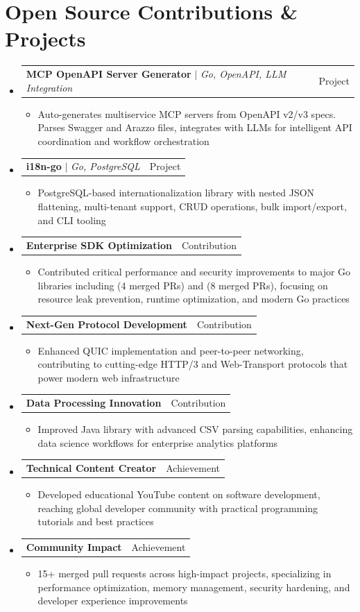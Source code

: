 \documentclass[letterpaper,11pt]{article}
\makeatletter
\newcommand{\resumeItem}[1]{
  \item\small{
    {#1 \vspace{-2pt}}
  }
}
\newcommand{\resumeProjectHeading}[2]{
    \item
    \begin{tabular*}{0.97\textwidth}{l@{\extracolsep{\fill}}r}
      \small#1 & #2 \\
    \end{tabular*}\vspace{-7pt}
}
\newcommand{\resumeSubHeadingListStart}{\begin{itemize}[leftmargin=0.15in, label={}]}
\newcommand{\resumeSubHeadingListEnd}{\end{itemize}}
\newcommand{\resumeItemListStart}{\begin{itemize}}
\newcommand{\resumeItemListEnd}{\end{itemize}\vspace{-5pt}}
\makeatother
\begin{document}
\section{Open Source Contributions \& Projects}
  \resumeSubHeadingListStart
    \resumeProjectHeading
          {\textbf{MCP OpenAPI Server Generator} $|$ \emph{Go, OpenAPI, LLM Integration}}{Project}
          \resumeItemListStart
            \resumeItem{Auto-generates multiservice MCP servers from OpenAPI v2/v3 specs. Parses Swagger and Arazzo files, integrates with LLMs for intelligent API coordination and workflow orchestration}
          \resumeItemListEnd
    \resumeProjectHeading
          {\textbf{i18n-go} $|$ \emph{Go, PostgreSQL}}{Project}
          \resumeItemListStart
            \resumeItem{PostgreSQL-based internationalization library with nested JSON flattening, multi-tenant support, CRUD operations, bulk import/export, and CLI tooling}
          \resumeItemListEnd
    \resumeProjectHeading
          {\textbf{Enterprise SDK Optimization}}{Contribution}
          \resumeItemListStart
            \resumeItem{Contributed critical performance and security improvements to major Go libraries including (4 merged PRs) and (8 merged PRs), focusing on resource leak prevention, runtime optimization, and modern Go practices}
          \resumeItemListEnd
    \resumeProjectHeading
          {\textbf{Next-Gen Protocol Development}}{Contribution}
          \resumeItemListStart
            \resumeItem{Enhanced QUIC implementation and peer-to-peer networking, contributing to cutting-edge HTTP/3 and Web-Transport protocols that power modern web infrastructure}
          \resumeItemListEnd
    \resumeProjectHeading
          {\textbf{Data Processing Innovation}}{Contribution}
          \resumeItemListStart
            \resumeItem{Improved Java library with advanced CSV parsing capabilities, enhancing data science workflows for enterprise analytics platforms}
          \resumeItemListEnd
    \resumeProjectHeading
          {\textbf{Technical Content Creator}}{Achievement}
          \resumeItemListStart
            \resumeItem{Developed educational YouTube content on software development, reaching global developer community with practical programming tutorials and best practices}
          \resumeItemListEnd
    \resumeProjectHeading
          {\textbf{Community Impact}}{Achievement}
          \resumeItemListStart
            \resumeItem{15+ merged pull requests across high-impact projects, specializing in performance optimization, memory management, security hardening, and developer experience improvements}
          \resumeItemListEnd
  \resumeSubHeadingListEnd

\end{document}
